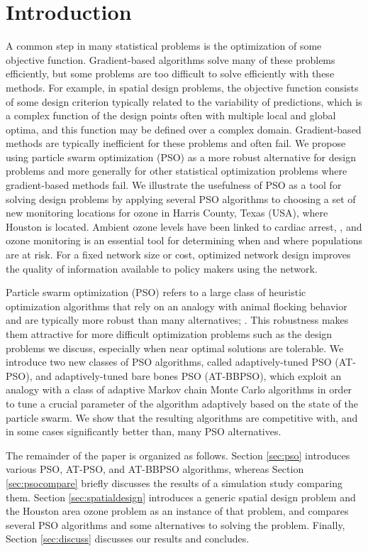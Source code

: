 \documentclass[cmbright]{staauth}
\begin{document}
\section{Introduction}
A common step in many statistical problems is the optimization of some objective function. Gradient-based algorithms solve many of these problems efficiently, but some problems are too difficult to solve efficiently with these methods. For example, in spatial design problems, the objective function consists of some design criterion typically related to the variability of predictions, which is a complex function of the design points often with multiple local and global optima, and this function may be defined over a complex domain. Gradient-based methods are typically inefficient for these problems and often fail. We propose using particle swarm optimization (PSO) as a more robust alternative for design problems and more generally for other statistical optimization problems where gradient-based methods fail. We illustrate the usefulness of PSO as a tool for solving design problems by applying several PSO algorithms to choosing a set of new monitoring locations for ozone in Harris County, Texas (USA), where Houston is located. Ambient ozone levels have been linked to cardiac arrest, \cite{ensor2013case}, and ozone monitoring is an essential tool for determining when and where populations are at risk. For a fixed network size or cost, optimized network design improves the quality of information available to policy makers using the network.

Particle swarm optimization (PSO) refers to a large class of heuristic optimization algorithms that rely on an analogy with animal flocking behavior and are typically more robust than many alternatives; \cite{clerc2002particle,blum2008swarm,clerc2010particle}. This robustness makes them attractive for more difficult optimization problems such as the design problems we discuss, especially when near optimal solutions are tolerable. We introduce two new classes of PSO algorithms, called adaptively-tuned PSO (AT-PSO), and adaptively-tuned bare bones PSO (AT-BBPSO), which exploit an analogy with a class of adaptive Markov chain Monte Carlo algorithms in order to tune a crucial parameter of the algorithm adaptively based on the state of the particle swarm. We show that the resulting algorithms are competitive with, and in some cases significantly better than, many PSO alternatives.

The remainder of the paper is organized as follows. Section \ref{sec:pso} introduces various PSO, AT-PSO, and AT-BBPSO algorithms, whereas Section \ref{sec:psocompare} briefly discusses the results of a simulation study comparing them. Section \ref{sec:spatialdesign} introduces a generic spatial design problem and the Houston area ozone problem as an instance of that problem, and compares several PSO algorithms and some alternatives to solving the problem. Finally, Section \ref{sec:discuss} discusses our results and concludes. 
\end{document}
